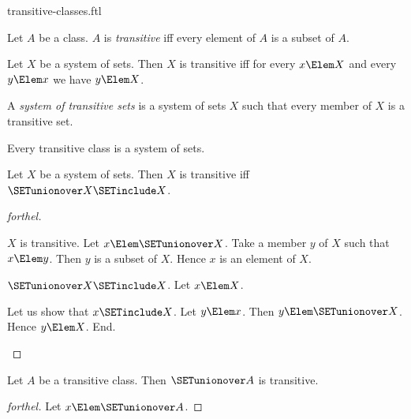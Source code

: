 \documentclass{stex}
\begin{document}
\begin{smodule}{transitive-classes.ftl}

\begin{definition}[forthel,id=SET_THEORY_01_8167915266244608]
  Let $A$ be a class.
  $A$ is \emph{transitive} iff every element of $A$ is a subset of $A$.
\end{definition}

\begin{proposition}[forthel,id=SET_THEORY_01_6964770955591680]
  Let $X$ be a system of sets.
  Then $X$ is transitive iff for every $x \Elem X$ and every $y \Elem x$ we have $y \Elem X$.
\end{proposition}

\begin{definition}[forthel,id=SET_THEORY_01_4219967964708864]
  A \emph{system of transitive sets} is a system of sets $X$ such that every member of $X$ is a transitive set.
\end{definition}

\begin{proposition}[forthel,id=SET_THEORY_01_2095807333400576]
  Every transitive class is a system of sets.
\end{proposition}

\begin{proposition}[forthel,id=SET_THEORY_01_6524117649981440]
  Let $X$ be a system of sets.
  Then $X$ is transitive iff $\SETunionover X \SETinclude X$.
\end{proposition}
\begin{proof}[forthel]
  \begin{case}{$X$ is transitive.}
    Let $x \Elem \SETunionover X$.
    Take a member $y$ of $X$ such that $x \Elem y$.
    Then $y$ is a subset of $X$.
    Hence $x$ is an element of $X$.
  \end{case}

  \begin{case}{$\SETunionover X \SETinclude X$.}
    Let $x \Elem X$.

    Let us show that $x \SETinclude X$.
      Let $y \Elem x$.
      Then $y \Elem \SETunionover X$.
      Hence $y \Elem X$.
    End.
  \end{case}
\end{proof}

\begin{proposition}[forthel,id=SET_THEORY_01_620651482185728]
  Let $A$ be a transitive class.
  Then $\SETunionover A$ is transitive.
\end{proposition}
\begin{proof}[forthel]
  Let $x \Elem \SETunionover A$.


\end{proof}
\end{smodule}
\end{document}
